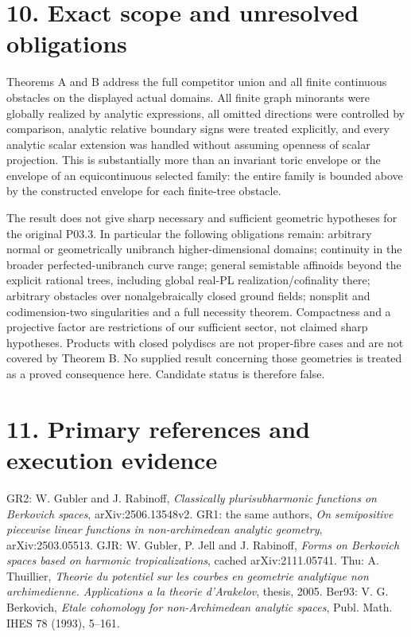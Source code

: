 \documentclass[11pt]{article}
\begin{document}
\section*{10. Exact scope and unresolved obligations}

Theorems A and B address the full competitor union and all finite continuous obstacles on the displayed actual domains. All finite graph minorants were globally realized by analytic expressions, all omitted directions were controlled by comparison, analytic relative boundary signs were treated explicitly, and every analytic scalar extension was handled without assuming openness of scalar projection. This is substantially more than an invariant toric envelope or the envelope of an equicontinuous selected family: the entire family is bounded above by the constructed envelope for each finite-tree obstacle.

The result does not give sharp necessary and sufficient geometric hypotheses for the original P03.3. In particular the following obligations remain: arbitrary normal or geometrically unibranch higher-dimensional domains; continuity in the broader perfected-unibranch curve range; general semistable affinoids beyond the explicit rational trees, including global real-PL realization/cofinality there; arbitrary obstacles over nonalgebraically closed ground fields; nonsplit and codimension-two singularities and a full necessity theorem. Compactness and a projective factor are restrictions of our sufficient sector, not claimed sharp hypotheses. Products with closed polydiscs are not proper-fibre cases and are not covered by Theorem B. No supplied result concerning those geometries is treated as a proved consequence here. Candidate status is therefore false.

\section*{11. Primary references and execution evidence}

GR2: W. Gubler and J. Rabinoff, \emph{Classically plurisubharmonic functions on Berkovich spaces}, arXiv:2506.13548v2. GR1: the same authors, \emph{On semipositive piecewise linear functions in non-archimedean analytic geometry}, arXiv:2503.05513. GJR: W. Gubler, P. Jell and J. Rabinoff, \emph{Forms on Berkovich spaces based on harmonic tropicalizations}, cached arXiv:2111.05741. Thu: A. Thuillier, \emph{Theorie du potentiel sur les courbes en geometrie analytique non archimedienne. Applications a la theorie d'Arakelov}, thesis, 2005. Ber93: V. G. Berkovich, \emph{Etale cohomology for non-Archimedean analytic spaces}, Publ. Math. IHES 78 (1993), 5--161.
\end{document}
